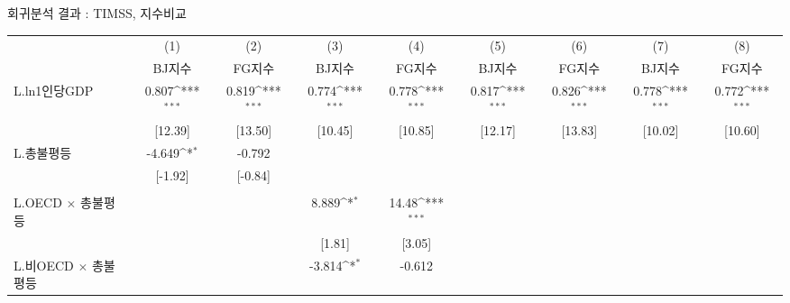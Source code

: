 \centering
\def\sym#1{\ifmmode^{#1}\else\(^{#1}\)\fi}
\caption{회귀분석 결과 : TIMSS, 지수비교 \label{tab:timss_rob1}}
\begin{tabular}{l*{8}{c}}
\toprule
                    &\multicolumn{1}{c}{(1)}&\multicolumn{1}{c}{(2)}&\multicolumn{1}{c}{(3)}&\multicolumn{1}{c}{(4)}&\multicolumn{1}{c}{(5)}&\multicolumn{1}{c}{(6)}&\multicolumn{1}{c}{(7)}&\multicolumn{1}{c}{(8)}\\
                    &\multicolumn{1}{c}{BJ지수}&\multicolumn{1}{c}{FG지수}&\multicolumn{1}{c}{BJ지수}&\multicolumn{1}{c}{FG지수}&\multicolumn{1}{c}{BJ지수}&\multicolumn{1}{c}{FG지수}&\multicolumn{1}{c}{BJ지수}&\multicolumn{1}{c}{FG지수}\\
\midrule
L.ln1인당GDP        &       0.807\sym{***}&       0.819\sym{***}&       0.774\sym{***}&       0.778\sym{***}&       0.817\sym{***}&       0.826\sym{***}&       0.778\sym{***}&       0.772\sym{***}\\
                    &     [12.39]         &     [13.50]         &     [10.45]         &     [10.85]         &     [12.17]         &     [13.83]         &     [10.02]         &     [10.60]         \\
\addlinespace
L.총불평등          &      -4.649\sym{*}  &      -0.792         &                     &                     &                     &                     &                     &                     \\
                    &     [-1.92]         &     [-0.84]         &                     &                     &                     &                     &                     &                     \\&                     &                     &                     &                     &                     &                     &                     \\
\addlinespace
L.OECD $\times$ 총불평등&                     &                     &       8.889\sym{*}  &       14.48\sym{***}&                     &                     &                     &                     \\
                    &                     &                     &      [1.81]         &      [3.05]         &                     &                     &                     &                     \\
\addlinespace
L.비OECD $\times$ 총불평등&                     &                     &      -3.814\sym{*}  &      -0.612         &                     &                     &                     &                     \\

\end{tabular}
